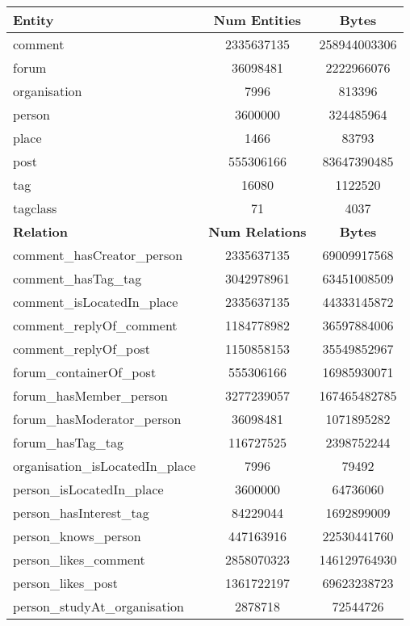 \begin{table}[H]
\centering
\begin{tabular} {| l | c | c |}
\hline
\textbf{Entity} & \textbf{Num Entities} & \textbf{Bytes} \\
\hline \hline
comment & 2335637135 & 258944003306 \\
\hline
forum & 36098481 & 2222966076 \\
\hline
organisation & 7996 & 813396 \\
\hline
person & 3600000 & 324485964 \\
\hline
place & 1466 & 83793 \\
\hline
post & 555306166 & 83647390485 \\
\hline
tag & 16080 & 1122520 \\
\hline
tagclass & 71 & 4037 \\
\hline \hline
\textbf{Relation} & \textbf{Num Relations} & \textbf{Bytes} \\
\hline \hline
comment\_hasCreator\_person & 2335637135 & 69009917568 \\
\hline
comment\_hasTag\_tag & 3042978961 & 63451008509 \\
\hline
comment\_isLocatedIn\_place & 2335637135 & 44333145872 \\
\hline
comment\_replyOf\_comment & 1184778982 & 36597884006 \\
\hline
comment\_replyOf\_post & 1150858153 & 35549852967 \\
\hline
forum\_containerOf\_post & 555306166 & 16985930071 \\
\hline
forum\_hasMember\_person & 3277239057 & 167465482785 \\
\hline
forum\_hasModerator\_person & 36098481 & 1071895282 \\
\hline
forum\_hasTag\_tag & 116727525 & 2398752244 \\
\hline
organisation\_isLocatedIn\_place & 7996 & 79492 \\
\hline
person\_isLocatedIn\_place & 3600000 & 64736060 \\
\hline
person\_hasInterest\_tag & 84229044 & 1692899009 \\
\hline
person\_knows\_person & 447163916 & 22530441760 \\
\hline
person\_likes\_comment & 2858070323 & 146129764930 \\
\hline
person\_likes\_post & 1361722197 & 69623238723 \\
\hline
person\_studyAt\_organisation & 2878718 & 72544726 \\

\end{tabular}
\end{table}
